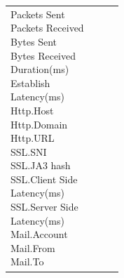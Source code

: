 \begin{description}
\begin{longtable}{p{}|p{}|p{}|p{}}
{                                                                                                    Packets Sent\\
                                                                                                    Packets Received\\
                                                                                                    Bytes Sent\\
                                                                                                    Bytes Received\\
                                                                                                    Duration(ms)\\
                                                                                                    Establish\\ Latency(ms)\\
                                                                                                    Http.Host\\
                                                                                                    Http.Domain\\
                                                                                                    Http.URL\\
                                                                                                    SSL.SNI\\
                                                                                                    SSL.JA3 hash\\
                                                                                                    SSL.Client Side\\ Latency(ms)\\
                                                                                                    SSL.Server Side\\ Latency(ms)\\
                                                                                                    Mail.Account\\
                                                                                                    Mail.From\\
                                                                                                    Mail.To\\
}
\end{longtable}
\end{description}
